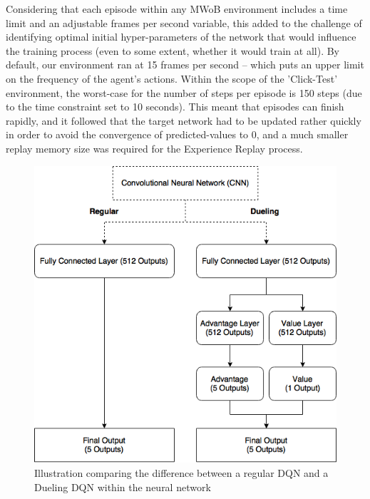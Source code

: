 \documentclass[10pt,journal,compsoc]{IEEEtran}
\begin{document}
Considering that each episode within any MWoB environment includes a time limit and an adjustable frames per second variable, this added to the challenge of identifying optimal initial hyper-parameters of the network that would influence the training process (even to some extent, whether it would train at all). By default, our environment ran at 15 frames per second  -- which puts an upper limit on the frequency of the agent's actions. Within the scope of the 'Click-Test' environment, the worst-case for the number of steps per episode is 150 steps (due to the time constraint set to 10 seconds). This meant that episodes can finish rapidly, and it followed that the target network had to be updated rather quickly in order to avoid the convergence of predicted-values to 0, and a much smaller replay memory size was required for the Experience Replay process.\linebreak

\begin{figure}[h]
\centering
	\includegraphics[width=\columnwidth, keepaspectratio]{dueling.png}
	\caption{Illustration comparing the difference between a regular DQN and a Dueling DQN within the neural network}
	\label{fig:dueling}
\end{figure}
\end{document}
